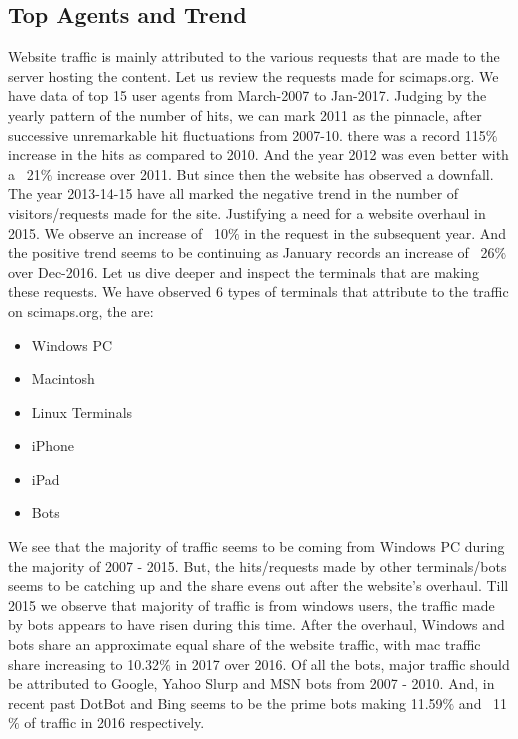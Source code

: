 \subsection{Top Agents and Trend} \label{viztopagents}
Website traffic is mainly attributed to the  various requests that are made to the server hosting the content. Let us review the requests made for scimaps.org. 
We have data of top 15 user agents from March-2007 to Jan-2017.  
Judging by the yearly pattern of the number of hits, we can mark 2011 as the pinnacle, after successive unremarkable hit fluctuations from 2007-10. there was a record 115$\%$ increase in the hits as compared to 2010. And the year 2012 was even better with a ~21$\%$ increase over 2011. But since then the website has observed a downfall. The year 2013-14-15 have all marked the negative trend in the number of visitors/requests made for the site. Justifying a need for a website overhaul in 2015. We observe an increase of ~10$\%$ in the request in the subsequent year. And the positive trend seems to be continuing as January records an increase of ~26$\%$  over Dec-2016.
Let us dive deeper and inspect the terminals that are making these requests. We have observed 6 types of terminals that attribute to the traffic on scimaps.org, the are:
\begin{itemize}
\item Windows PC
\item Macintosh
\item Linux Terminals
\item iPhone
\item iPad
\item Bots
\end{itemize}
We see that the majority of traffic seems to be coming from Windows PC during the majority of 2007 - 2015. But, the hits/requests made by other terminals/bots seems to be catching up and the share evens out after the website’s overhaul. Till 2015 we observe that majority of traffic is from windows users, the traffic made by bots appears to have risen during this time. After the overhaul, Windows and bots share an approximate equal share of the website traffic, with mac traffic share increasing to 10.32$\%$ in 2017 over 2016. 
Of all the bots, major traffic should be attributed to Google, Yahoo Slurp and MSN bots from 2007 - 2010. And, in recent past DotBot and Bing seems to be the prime bots making 11.59$\%$ and ~11$\%$ of traffic in 2016 respectively.
